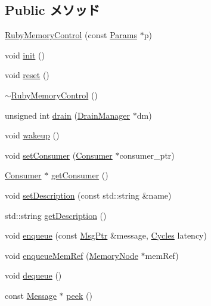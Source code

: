 \subsection*{Public メソッド}
\begin{DoxyCompactItemize}
\item 
\hyperlink{classRubyMemoryControl_a4f3e4d7624fbb425e553c4e36cadcba9}{RubyMemoryControl} (const \hyperlink{classRubyMemoryControl_af43d4e91847a2856227bcb75a70a9a86}{Params} $\ast$p)
\item 
void \hyperlink{classRubyMemoryControl_a02fd73d861ef2e4aabb38c0c9ff82947}{init} ()
\item 
void \hyperlink{classRubyMemoryControl_ad20897c5c8bd47f5d4005989bead0e55}{reset} ()
\item 
\hyperlink{classRubyMemoryControl_ac811a91e31835fa2b05aec4314ca6870}{$\sim$RubyMemoryControl} ()
\item 
unsigned int \hyperlink{classRubyMemoryControl_aa8a18d230dba7a674ac8a0b4f35bc36a}{drain} (\hyperlink{classDrainManager}{DrainManager} $\ast$dm)
\item 
void \hyperlink{classRubyMemoryControl_ae674290a26ecbd622c5160e38e8a4fe9}{wakeup} ()
\item 
void \hyperlink{classRubyMemoryControl_a8487c37680239f103e21ada9acf1726d}{setConsumer} (\hyperlink{classConsumer}{Consumer} $\ast$consumer\_\-ptr)
\item 
\hyperlink{classConsumer}{Consumer} $\ast$ \hyperlink{classRubyMemoryControl_a2417fc7252a612b5c976ceaa2d1be4f7}{getConsumer} ()
\item 
void \hyperlink{classRubyMemoryControl_a9cdbe64eebafb111a124edec55ed2340}{setDescription} (const std::string \&name)
\item 
std::string \hyperlink{classRubyMemoryControl_a73da75c3e5ec30855a02eae2ba824e38}{getDescription} ()
\item 
void \hyperlink{classRubyMemoryControl_a068a03cd419d33592fd584ec5877bb64}{enqueue} (const \hyperlink{classRefCountingPtr}{MsgPtr} \&message, \hyperlink{classCycles}{Cycles} latency)
\item 
void \hyperlink{classRubyMemoryControl_aadad7bc8b989cfe93247844131735f70}{enqueueMemRef} (\hyperlink{classMemoryNode}{MemoryNode} $\ast$memRef)
\item 
void \hyperlink{classRubyMemoryControl_a851b6644e3e336c07f8e6fe77234b97f}{dequeue} ()
\item 
const \hyperlink{classMessage}{Message} $\ast$ \hyperlink{classRubyMemoryControl_ab635dc32ebecf260c15d8fbbbb9b21e0}{peek} ()

\end{DoxyCompactItemize}
